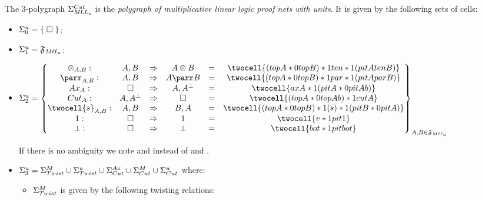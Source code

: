 \documentclass[a4paper]{article}
\begin{document}
\begin{definition}
The $3$-polygraph $ \Sigma_{\mathit{MLL_u}}^{Cut}$ is the \emph{polygraph of multiplicative linear logic proof nets with units}. It is given by the following sets of cells:
\begin{multicols}{2}
\begin{itemize}
\item $\Sigma^u_0=\{\; \square \;\}$;
\item $\Sigma^u_1={\mathfrak{F}_{M\ell \ell _u}} $;
\end{itemize}
\end{multicols}
\begin{itemize}
\item $\s^u_2=\begin{Bmatrix}
\otimes_{A,B}: &  A , B &\frr & A\otimes B& = & \twocell{(topA *0 topB) *1 ten *1 (pitAtenB)}  \\
\parr_{A,B}: &  A , B &\frr & A\parr B  & = &      \twocell{(topA *0 topB) *1 par *1 (pitAparB)} \\
Ax_A: & \pro &\frr & A , A^\bot  & = & {\twocell{axA *1 (pitA *0 pitAb)}}\\
Cut_A: &  A , A^\bot &\frr & \pro  & = & {\twocell{(topA *0 topAb) *1 cutA}}\\
\twocell{s}_{A,B}: &  A , B &\frr & B , A & = & \twocell{(topA *0 topB)*1 (s)*1(pitB *0 pitA)}\\
1: & \pro &\frr & 1 & =& \twocell{v *1 pit1}\\
\bot: & \pro &\frr &\bot  &=& \twocell{bot *1 pitbot}
\end{Bmatrix}_{A,B\in \fmllc}$

If there is no ambiguity we note  and  instead of  and .

\item $\Sigma^u_3=\Sigma^M_{Twist} \cup \Sigma^u_{Twist} \cup \Sigma^{Ax}_{Cut} \cup \Sigma^M_{Cut} \cup \Sigma^u_{Cut}$ where:


\begin{itemize} 
\item $\Sigma^M_{Twist}$ is given by the following twisting relations:
\end{itemize}


\end{itemize}
\end{definition}
\end{document}
